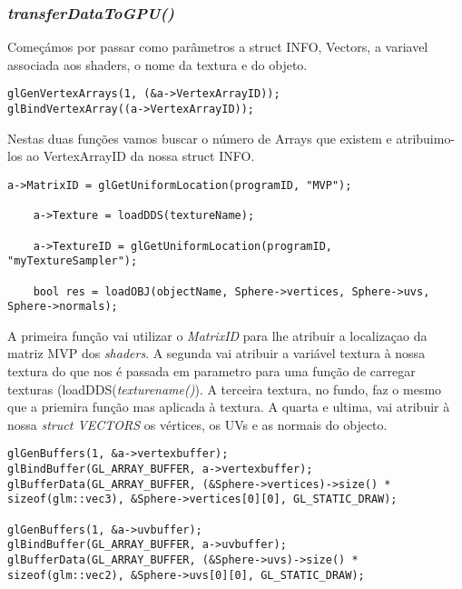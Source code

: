 \subsubsection{\textit{transferDataToGPU()}}
Começámos por passar como parâmetros a struct INFO, Vectors, a variavel associada aos shaders, o nome da textura e do objeto.

\begin{lstlisting}[caption=\textit{VertexArray} funções.]
glGenVertexArrays(1, (&a->VertexArrayID));
glBindVertexArray((a->VertexArrayID));
\end{lstlisting}
Nestas duas funções vamos buscar o número de Arrays que existem e atribuimo-los ao VertexArrayID da nossa struct INFO.

\begin{lstlisting}[caption=\textit{VertexArray} funções.]
	a->MatrixID = glGetUniformLocation(programID, "MVP");

	a->Texture = loadDDS(textureName);

	a->TextureID = glGetUniformLocation(programID, "myTextureSampler");

	bool res = loadOBJ(objectName, Sphere->vertices, Sphere->uvs, Sphere->normals);
\end{lstlisting}

A primeira função vai utilizar o \textit{MatrixID} para lhe atribuir a localizaçao da matriz MVP dos \textit{shaders}. A segunda vai atribuir a variável textura à nossa textura do que nos é passada em parametro para uma função de carregar texturas (loadDDS(\textit{texturename()}). A terceira textura, no fundo, faz o mesmo que a priemira função mas aplicada à textura. A quarta e ultima, vai atribuir à nossa \textit{struct VECTORS} os vértices, os UVs e as normais do objecto.


\begin{lstlisting}[caption=\textit{Buffers} funções.]
glGenBuffers(1, &a->vertexbuffer);
glBindBuffer(GL_ARRAY_BUFFER, a->vertexbuffer);
glBufferData(GL_ARRAY_BUFFER, (&Sphere->vertices)->size() * sizeof(glm::vec3), &Sphere->vertices[0][0], GL_STATIC_DRAW);

glGenBuffers(1, &a->uvbuffer);
glBindBuffer(GL_ARRAY_BUFFER, a->uvbuffer);
glBufferData(GL_ARRAY_BUFFER, (&Sphere->uvs)->size() * sizeof(glm::vec2), &Sphere->uvs[0][0], GL_STATIC_DRAW);
\end{lstlisting}

